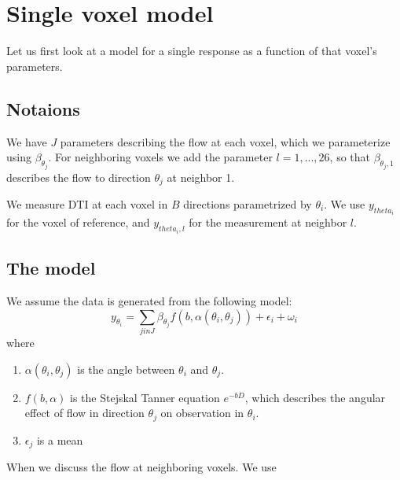 \documentclass[11pt]{amsart}
\newcommand{\tj}{\theta_j}
\newcommand{\ti}{\theta_i}
\newcommand{\yti}{y_{theta_i}}
\newcommand{\ytil}{y_{theta_i,l}}
\begin{document}
\section{Single voxel model}
Let us first look at a model for a single response as a function of that voxel's parameters. 

\subsection{Notaions}
We have $J$ parameters describing the flow at each voxel, which we parameterize 
using $\beta_{\theta_j}$. For neighboring voxels we add the parameter $l = 1,...,26$, 
so that  $\beta_{\theta_j, 1}$ describes the flow to direction $\theta_j$ at neighbor 1. 

We measure DTI at each voxel in $B$ directions parametrized by $\theta_i$. 
We use $\yti$ for the voxel of reference, and $\ytil$ for the 
measurement at neighbor $l$. 

\subsection{The model}
We assume the data is generated from the following model:
\[y_{\theta_i} = \sum_{j in J} \beta_{\theta_j} f(b, \alpha(\theta_i, \theta_j)) + \epsilon_i +  \omega_i \]
where 
\begin{enumerate}
\item $\alpha(\theta_i, \theta_j) $ is the angle between $\ti$ and $\tj$.
\item $f(b, \alpha)$ is the Stejskal \-Tanner equation $e^{-b D}$, which describes the 
angular effect of flow in direction $\tj$ on observation in $\ti$. 
\item $\epsilon_j$ is a mean 
\end{enumerate}
 
 
When we discuss the flow at neighboring voxels.  
We use



%
\end{document}
